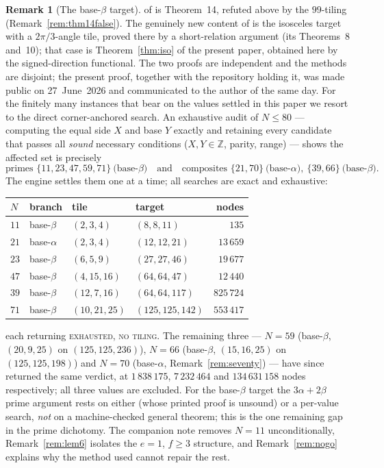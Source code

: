 \documentclass[11pt,reqno]{amsart}
\theoremstyle{plain}
\theoremstyle{definition}
\newtheorem{remark}[theorem]{Remark}
\newcommand{\Z}{\mathbb{Z}}
\begin{document}
\begin{remark}[The base-$\beta$ target]
of \cite{BeesonIII} is Theorem~14, refuted above by the $99$-tiling
(Remark~\ref{rem:thm14false}). The genuinely new content of \cite{BeesonNoPrime} is the isosceles
target with a $2\pi/3$-angle tile, proved there by a short-relation argument (its Theorems~8
and~10); that case is Theorem~\ref{thm:iso} of the present paper, obtained here by the
signed-direction functional. The two proofs are independent and the methods are disjoint; the
present proof, together with the repository holding it, was made public on 27~June~2026 and
communicated to the author of \cite{BeesonNoPrime} the same day. For the finitely many instances that bear on the values settled in this
paper we resort to the direct corner-anchored search. An exhaustive audit of $N\le80$ --- computing
the equal side $X$ and base $Y$ exactly and retaining every candidate that passes all \emph{sound}
necessary conditions ($X,Y\in\Z$, parity, range) --- shows the affected set is precisely
\[
\text{primes } \{11,23,47,59,71\}\ \text{(base-}\beta\text{)}\quad\text{and}\quad
\text{composites } \{21,70\}\ \text{(base-}\alpha\text{)},\ \{39,66\}\ \text{(base-}\beta\text{)} .
\]
The engine settles them one at a time; all searches are exact and exhaustive:
\begin{center}
\begin{tabular}{llllr}
$N$ & branch & tile & target & nodes\\ \hline
$11$ & base-$\beta$  & $(2,3,4)$    & $(8,8,11)$      & $135$\\
$21$ & base-$\alpha$ & $(2,3,4)$    & $(12,12,21)$    & $13\,659$\\
$23$ & base-$\beta$  & $(6,5,9)$    & $(27,27,46)$    & $19\,677$\\
$47$ & base-$\beta$  & $(4,15,16)$  & $(64,64,47)$    & $12\,440$\\
$39$ & base-$\beta$  & $(12,7,16)$  & $(64,64,117)$   & $825\,724$\\
$71$ & base-$\beta$  & $(10,21,25)$ & $(125,125,142)$ & $553\,417$\\
\end{tabular}
\end{center}
\noindent each returning \textsc{exhausted, no tiling}. The remaining three --- $N=59$
(base-$\beta$, $(20,9,25)$ on $(125,125,236)$), $N=66$ (base-$\beta$, $(15,16,25)$ on
$(125,125,198)$) and $N=70$ (base-$\alpha$, Remark~\ref{rem:seventy}) --- have since returned the
same verdict, at $1\,838\,175$, $7\,232\,464$ and $134\,631\,158$ nodes respectively; all three
values are excluded. For the base-$\beta$ target the
$3\alpha+2\beta$ prime argument rests on either \cite[Thm.~14]{BeesonIII} (whose printed proof is
unsound) or a per-value search, \emph{not} on a machine-checked general theorem; this is the one
remaining gap in the prime dichotomy. The companion note \cite{Companion} removes $N=11$
unconditionally, Remark~\ref{rem:lem6} isolates the $e=1$, $f\ge3$ structure, and
Remark~\ref{rem:nogo} explains why the method \cite{BeesonIII} used cannot repair the rest.
\end{remark}
\end{document}
